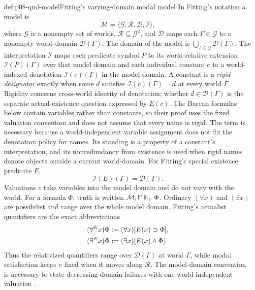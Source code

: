 \begin{hbdefinition}{def:p08-qml-model}{Fitting's varying-domain modal model}
In Fitting's notation a model is
\[
 \mathcal M=\langle\mathcal G,\mathcal R,\mathcal D,\mathcal I\rangle,
\]
where \(\mathcal G\) is a nonempty set of worlds,
\(\mathcal R\subseteq\mathcal G^2\), and
\(\mathcal D\) maps each \(\Gamma\in\mathcal G\) to a nonempty world-domain
\(\mathcal D(\Gamma)\).  The domain of the model is
\(\bigcup_{\Gamma\in\mathcal G}\mathcal D(\Gamma)\).  The interpretation
\(\mathcal I\) maps each predicate symbol \(P\) to its world-relative
extension \(\mathcal I(P)(\Gamma)\) over that model domain and each individual
constant \(c\) to a world-indexed denotation
\(\mathcal I(c)(\Gamma)\) in the model domain.  A constant is a
\emph{rigid designator} exactly when some \(d\) satisfies
\(\mathcal I(c)(\Gamma)=d\) at every world \(\Gamma\).  Rigidity concerns
cross-world identity of denotation; whether \(d\in\mathcal D(\Gamma)\) is the
separate actual-existence question expressed by \(E(c)\).  The Barcan formulas
below contain variables rather than constants, so their proof uses the fixed
valuation convention and does not assume that every name is rigid.
The term is necessary because a world-independent variable assignment does not
fix the denotation policy for names.  Its standing is a property of a constant's
interpretation, and its nonredundancy from existence is used when rigid names
denote objects outside a current world-domain.  For Fitting's special
existence predicate \(E\),
\[
 \mathcal I(E)(\Gamma)=\mathcal D(\Gamma).
\]
Valuations \(v\) take variables into the model domain and do not vary with the
world.  For a formula \(\Phi\), truth is written
\(\mathcal M,\Gamma\Vdash_v\Phi\).  Ordinary
\((\forall x)\) and \((\exists x)\) are possibilist and range over the whole
model domain.  Fitting's actualist quantifiers are the exact abbreviations
\[
\begin{aligned}
 (\forall^{E}x)\Phi
 &\mathrel{:=} (\forall x)[E(x)\supset\Phi],\\
 (\exists^{E}x)\Phi
 &\mathrel{:=} (\exists x)[E(x)\land\Phi].
\end{aligned}
\]
Thus the relativized quantifiers range over \(\mathcal D(\Gamma)\) at world
\(\Gamma\), while modal satisfaction keeps \(v\) fixed when it moves along
\(\mathcal R\).  The model-domain convention is necessary to state
decreasing-domain failures with one world-independent valuation
\cite{Fitting2002Alethic,FittingMendelsohn1998}.
\end{hbdefinition}

